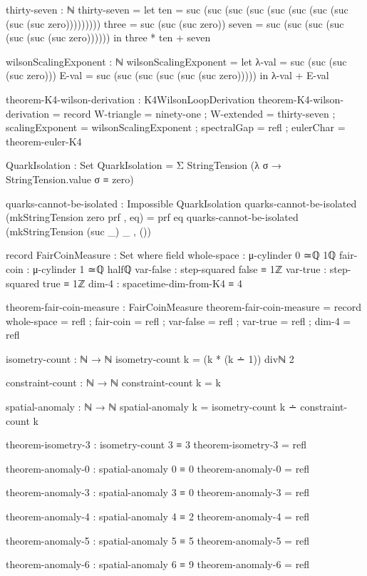 \documentclass[11pt,a4paper]{book}
\begin{document}
\begin{code}
thirty-seven : ℕ
thirty-seven = 
  let ten = suc (suc (suc (suc (suc (suc (suc (suc (suc (suc zero)))))))))
      three = suc (suc (suc zero))
      seven = suc (suc (suc (suc (suc (suc (suc zero))))))
  in three * ten + seven

wilsonScalingExponent : ℕ
wilsonScalingExponent = 
  let λ-val = suc (suc (suc (suc zero)))
      E-val = suc (suc (suc (suc (suc (suc zero)))))
  in λ-val + E-val

theorem-K4-wilson-derivation : K4WilsonLoopDerivation
theorem-K4-wilson-derivation = record
  { W-triangle = ninety-one
  ; W-extended = thirty-seven
  ; scalingExponent = wilsonScalingExponent
  ; spectralGap  = refl
  ; eulerChar    = theorem-euler-K4
  }

QuarkIsolation : Set
QuarkIsolation = Σ StringTension (λ σ → StringTension.value σ ≡ zero)

quarks-cannot-be-isolated : Impossible QuarkIsolation
quarks-cannot-be-isolated (mkStringTension zero prf , eq) = prf eq
quarks-cannot-be-isolated (mkStringTension (suc _) _ , ())

record FairCoinMeasure : Set where
  field
    whole-space : μ-cylinder 0 ≃ℚ 1ℚ
    fair-coin   : μ-cylinder 1 ≃ℚ halfℚ
    var-false   : step-squared false ≡ 1ℤ
    var-true    : step-squared true  ≡ 1ℤ
    dim-4       : spacetime-dim-from-K4 ≡ 4

theorem-fair-coin-measure : FairCoinMeasure
theorem-fair-coin-measure = record
  { whole-space = refl
  ; fair-coin   = refl
  ; var-false   = refl
  ; var-true    = refl
  ; dim-4       = refl
  }

isometry-count : ℕ → ℕ
isometry-count k = (k * (k ∸ 1)) divℕ 2

constraint-count : ℕ → ℕ
constraint-count k = k

spatial-anomaly : ℕ → ℕ
spatial-anomaly k = isometry-count k ∸ constraint-count k

theorem-isometry-3 : isometry-count 3 ≡ 3
theorem-isometry-3 = refl

theorem-anomaly-0 : spatial-anomaly 0 ≡ 0
theorem-anomaly-0 = refl

theorem-anomaly-3 : spatial-anomaly 3 ≡ 0
theorem-anomaly-3 = refl

theorem-anomaly-4 : spatial-anomaly 4 ≡ 2
theorem-anomaly-4 = refl

theorem-anomaly-5 : spatial-anomaly 5 ≡ 5
theorem-anomaly-5 = refl

theorem-anomaly-6 : spatial-anomaly 6 ≡ 9
theorem-anomaly-6 = refl


\end{code}
\end{document}

